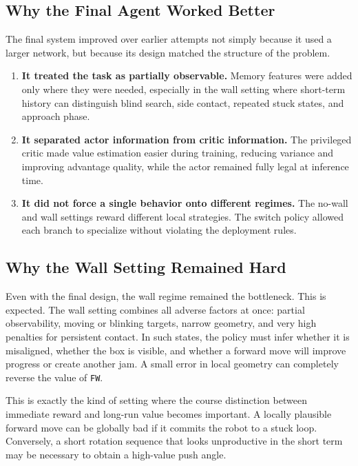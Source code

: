 \documentclass[11pt, oneside]{article}   	%
\begin{document}
\subsection{Why the Final Agent Worked Better}

The final system improved over earlier attempts not simply because it used a larger
network, but because its design matched the structure of the problem.

\begin{enumerate}[leftmargin=1.5em]
  \item \textbf{It treated the task as partially observable.} Memory features were added
  only where they were needed, especially in the wall setting where short-term history
  can distinguish blind search, side contact, repeated stuck states, and approach phase.

  \item \textbf{It separated actor information from critic information.} The privileged
  critic made value estimation easier during training, reducing variance and improving
  advantage quality, while the actor remained fully legal at inference time.

  \item \textbf{It did not force a single behavior onto different regimes.} The no-wall and
  wall settings reward different local strategies. The switch policy allowed each branch to
  specialize without violating the deployment rules.
\end{enumerate}

\subsection{Why the Wall Setting Remained Hard}

Even with the final design, the wall regime remained the bottleneck. This is expected.
The wall setting combines all adverse factors at once: partial observability, moving or
blinking targets, narrow geometry, and very high penalties for persistent contact. In
such states, the policy must infer whether it is misaligned, whether the box is visible,
and whether a forward move will improve progress or create another jam. A small error
in local geometry can completely reverse the value of \texttt{FW}.

This is exactly the kind of setting where the course distinction between immediate reward
and long-run value becomes important. A locally plausible forward move can be globally
bad if it commits the robot to a stuck loop. Conversely, a short rotation sequence that
looks unproductive in the short term may be necessary to obtain a high-value push angle.
\end{document}
